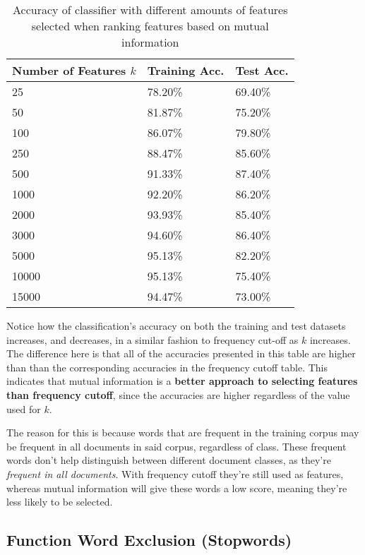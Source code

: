\documentclass{article}
\begin{document}
\begin{table}
	\centering
	\begin{tabular}{|l|l|l|}
	\hline
	\textbf{Number of Features $k$} & \textbf{Training Acc.} & \textbf{Test Acc.} \\
	\hline
	25 & 78.20\% & 69.40\% \\
	50 & 81.87\% & 75.20\% \\
	100 & 86.07\% & 79.80\% \\
	250 & 88.47\% & 85.60\% \\
	500 & 91.33\% & 87.40\% \\
	1000 & 92.20\% & 86.20\% \\
	2000 & 93.93\% & 85.40\% \\
	3000 & 94.60\% & 86.40\% \\
	5000 & 95.13\% & 82.20\% \\
	10000 & 95.13\% & 75.40\% \\
	15000 & 94.47\% & 73.00\% \\
	\hline
	\end{tabular}
	\caption{Accuracy of classifier with different amounts of features selected when ranking features based on mutual information}
	\label{tab:mutual_information}
\end{table}

Notice how the classification's accuracy on both the training and test datasets increases, and decreases, in a similar fashion to frequency cut-off as $k$ increases. The difference here is that all of the accuracies presented in this table are higher than than the corresponding accuracies in the frequency cutoff table. This indicates that mutual information is a \textbf{better approach to selecting features than frequency cutoff}, since the accuracies are higher regardless of the value used for $k$.

The reason for this is because words that are frequent in the training corpus may be frequent in all documents in said corpus, regardless of class. These frequent words don't help distinguish between different document classes, as they're \textit{frequent in all documents}. With frequency cutoff they're still used as features, whereas mutual information will give these words a low score, meaning they're less likely to be selected.

\subsection{Function Word Exclusion (Stopwords)}
\end{document}
